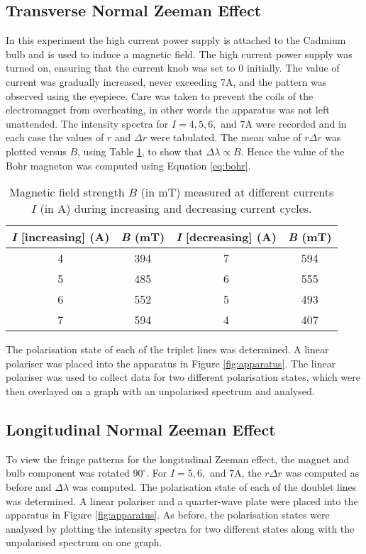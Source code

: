 \documentclass[11pt,twocolumn, a4paper]{article}
\numberwithin{equation}{section} %
\numberwithin{figure}{section} %
\numberwithin{table}{section} %
\begin{document}
\subsection{Transverse Normal Zeeman Effect}
In this experiment the high current power supply is attached to the Cadmium bulb and is used to induce a magnetic field. The high current power supply was turned on, ensuring that the current knob was set to \(0\) initially. The value of current was gradually increased, never exceeding \(7\)A, and the pattern was observed using the eyepiece.  Care was taken to prevent the coils of the electromagnet from overheating, in other words the apparatus was not left unattended. The intensity spectra for \(I = 4,5,6,\) and $7$A were recorded and in each case the values of \(r\) and \(\Delta r\) were tabulated. The mean value of \(r \Delta r\) was plotted versus \(B\), using Table \ref{tab:magnetic_field}, to show that \(\Delta \lambda \varpropto B \).  Hence the value of the Bohr magneton was computed using Equation \ref{eq:bohr}. \\ 
\begin{table}[H]
\caption{Magnetic field strength \( B \) (in mT) measured at different currents \( I \) (in A) during increasing and decreasing current cycles.}
    \centering
    \begin{tabular}{|c|c||c|c|}
        \hline
        \textit{I} [increasing] (A) & \textit{B} (mT) & \textit{I} [decreasing] (A) & \textit{B} (mT) \\
        \hline
        4 & 394 & 7 & 594 \\
        5 & 485 & 6 & 555 \\
        6 & 552 & 5 & 493 \\
        7 & 594 & 4 & 407 \\
        \hline
    \end{tabular}
    
    \label{tab:magnetic_field}
\end{table}

The polarisation state of each of the triplet lines was determined. A linear polariser was placed into the apparatus in Figure \ref{fig:apparatus}. The linear polariser was used to collect data for two different polarisation states, which were then overlayed on a graph with an unpolarised spectrum and analysed. 

\subsection{Longitudinal Normal Zeeman Effect}
To view the fringe patterns for the longitudinal Zeeman effect, the magnet and bulb component was rotated \(90^{\circ}\). For \(I = 5,6,\) and $7$A, the  \(r \Delta r\) was computed as before and \(\Delta \lambda\) was computed. The polarisation state of each of the doublet  lines was determined. A linear polariser and a quarter-wave plate were placed into the apparatus in Figure \ref{fig:apparatus}. As before, the polarisation states were analysed by plotting the intensity spectra for two different states along with the unpolarised spectrum on one graph. 
\end{document}
